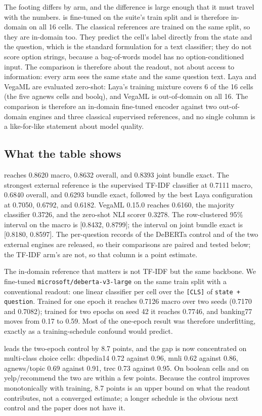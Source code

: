 The footing differs by arm, and the difference is large enough that it must travel with the
numbers. \vsix{} is fine-tuned on the suite's train split and is therefore in-domain on all 16
cells. The classical references are trained on the same split, so they are in-domain too. They predict
the cell's label directly from the state and the question, which is the standard formulation for a
text classifier; they do not score option strings, because a bag-of-words model has no
option-conditioned input. The comparison is therefore about the readout, not about access to
information: every arm sees the same state and the same question text.
Laya and VegaML are evaluated zero-shot: Laya's training mixture covers 6 of the 16 cells (the
five agnews cells and boolq), and VegaML is out-of-domain on all 16. The comparison is therefore
an in-domain fine-tuned encoder against two out-of-domain engines and three classical supervised
references, and no single column is a like-for-like statement about model quality.

\subsection{What the table shows}
\vsix{} reaches 0.8620 macro, 0.8632 overall, and 0.8393 joint bundle exact. The strongest
external reference is the supervised TF-IDF classifier at 0.7111 macro, 0.6840 overall, and
0.6293 bundle exact, followed by the best Laya configuration at 0.7050, 0.6792, and 0.6182.
VegaML 0.15.0 reaches 0.6160, the majority classifier 0.3726, and the zero-shot NLI scorer 0.3278.
The row-clustered 95\% interval on the \vsix{} macro is [0.8432, 0.8799]; the interval on joint
bundle exact is [0.8180, 0.8597]. The per-question records of the DeBERTa control and of the two
external engines are released, so their comparisons are paired and tested below; the TF-IDF arm's
are not, so that column is a point estimate.

The in-domain reference that matters is not TF-IDF but the same backbone. We fine-tuned
\texttt{microsoft/deberta-v3-large} on the same train split with a conventional readout: one linear
classifier per cell over the \texttt{[CLS]} of \texttt{state + question}. Trained for one epoch it
reaches 0.7126 macro over two seeds (0.7170 and 0.7082); trained for two epochs on seed 42 it
reaches 0.7746, and banking77 moves from 0.17 to 0.59. Most of the one-epoch result was therefore
underfitting, exactly as a training-schedule confound would predict.

\vsix{} leads the two-epoch control by 8.7 points, and the gap is now concentrated on multi-class
choice cells: dbpedia14 0.72 against 0.96, mnli 0.62 against 0.86, agnews/topic 0.69 against 0.91,
trec 0.73 against 0.95. On boolean cells and on yelp/recommend the two are within a few points.
Because the control improves monotonically with training, 8.7 points is an upper bound on what the
readout contributes, not a converged estimate; a longer schedule is the obvious next control and
the paper does not have it.

